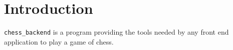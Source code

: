 \section{Introduction}

\texttt{chess\_backend} is a program providing the tools needed by any front end application to play a game of chess.
